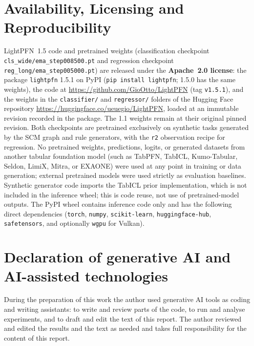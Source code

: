 \documentclass[11pt]{article}
\begin{document}
\section{Availability, Licensing and Reproducibility}
\label{sec:licensing}

LightPFN~1.5 code and pretrained weights (classification checkpoint \texttt{cls\_wide/ema\_step008500.pt} and regression checkpoint \texttt{reg\_long/ema\_step005000.pt}) are released under the \textbf{Apache~2.0 license}: the package \texttt{lightpfn} 1.5.1 on PyPI (\texttt{pip install lightpfn}; 1.5.0 has the same weights), the code at \url{https://github.com/GioOtto/LightPFN} (tag \texttt{v1.5.1}), and the weights in the \texttt{classifier/} and \texttt{regressor/} folders of the Hugging Face repository \url{https://huggingface.co/ueuegio/LightPFN}, loaded at an immutable revision recorded in the package. The 1.1 weights remain at their original pinned revision.
Both checkpoints are pretrained exclusively on synthetic tasks generated by the SCM graph and rule generators, with the \texttt{r2} observation recipe for regression.
No pretrained weights, predictions, logits, or generated datasets from another tabular foundation model (such as TabPFN, TabICL, Kumo-Tabular, Seldon, LimiX, Mitra, or EXAONE) were used at any point in training or data generation; external pretrained models were used strictly as evaluation baselines. Synthetic generator code imports the TabICL \cite{qu2025} prior implementation, which is not included in the inference wheel; this is code reuse, not use of pretrained-model outputs. %
The PyPI wheel contains inference code only and has the following direct dependencies (\texttt{torch}, \texttt{numpy}, \texttt{scikit-learn}, \texttt{huggingface-hub}, \texttt{safetensors}, and optionally \texttt{wgpu} for Vulkan).

\section*{Declaration of generative AI and AI-assisted technologies}
During the preparation of this work the author used generative AI tools as coding and writing assistants: to write and review parts of the code, to run and analyse experiments, and to draft and edit the text of this report. The author reviewed and edited the results and the text as needed and takes full responsibility for the content of this report.
\end{document}
